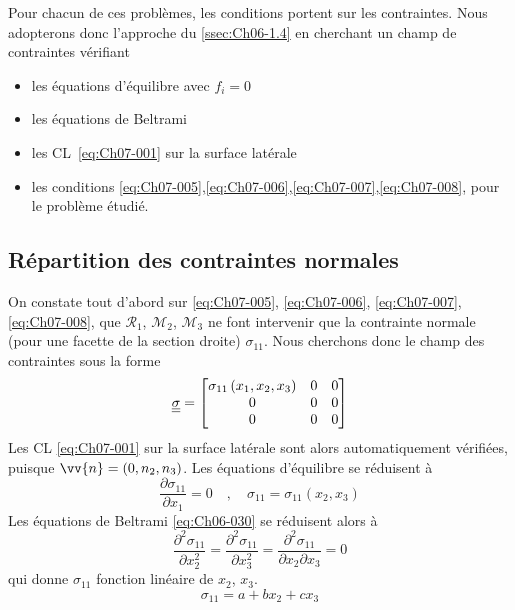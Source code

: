 Pour chacun de ces problèmes, les conditions portent sur les contraintes.
Nous adopterons donc l'approche du \ref{ssec:Ch06-1.4} en cherchant un champ de contraintes vérifiant
\begin{itemize}
    \item les équations d'équilibre avec $f_i=0$
    \item les équations de Beltrami
    \item les CL~\eqref{eq:Ch07-001} sur la surface latérale
    \item les conditions \eqref{eq:Ch07-005},\eqref{eq:Ch07-006},\eqref{eq:Ch07-007},\eqref{eq:Ch07-008}, pour le problème étudié.
\end{itemize}
\subsection{Répartition des contraintes normales}
On constate tout d'abord sur \eqref{eq:Ch07-005}, \eqref{eq:Ch07-006}, \eqref{eq:Ch07-007}, \eqref{eq:Ch07-008}, que $\mathcal{R}_1$, $\mathcal{M}_2$, $\mathcal{M}_3$ ne font intervenir que la contrainte normale (pour une facette de la section droite) $\sigma_{11}$.
Nous cherchons donc le champ des contraintes sous la forme
\begin{equation}
    \underline{\underline{\sigma}} = 
    \begin{bmatrix}
        \sigma_{11}\left( x_1, x_2, x_3 \right) & 0 & 0 \\
        0 & 0 & 0 \\
        0 & 0 & 0
    \end{bmatrix}
    \label{eq:Ch07-013}
\end{equation}
Les CL \eqref{eq:Ch07-001} sur la surface latérale sont alors automatiquement vérifiées, puisque $\vv{n}=\left( 0,n_2,n_3 \right)$.
Les équations d'équilibre se réduisent à
\begin{equation}
    \frac{\partial \sigma_{11}}{\partial x_1} = 0 \quad,\quad \sigma_{11} = \sigma_{11}\left( x_2,x_3 \right)
    \label{eq:Ch07-014}
\end{equation}
Les équations de Beltrami \eqref{eq:Ch06-030} se réduisent alors à
\begin{equation}
    \frac{\partial^2 \sigma_{11}}{\partial x_2^2} = \frac{\partial^2 \sigma_{11}}{\partial x_3^2} = \frac{\partial^2 \sigma_{11}}{\partial x_2 \partial x_3} = 0
    \label{eq:Ch07-015}
\end{equation}
qui donne $\sigma_{11}$ fonction linéaire de $x_2$, $x_3$.
\begin{equation}
    \sigma_{11} = a + b x_2 + c x_3
    \label{eq:Ch07-016}
\end{equation}
